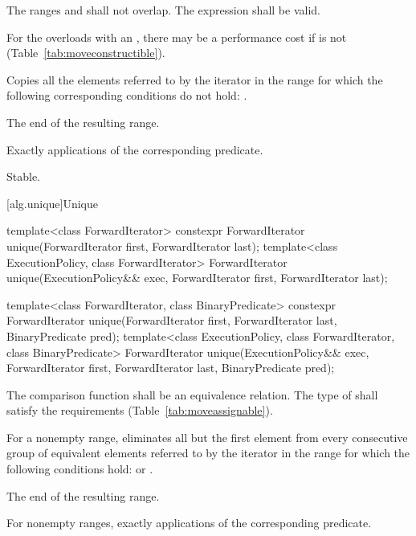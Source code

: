 \begin{itemdescr}
\pnum
\requires
The ranges
and
shall not overlap. The expression  shall be valid.
\begin{note}
For the overloads with an , there may be a performance
cost if  is not
 (Table~\ref{tab:moveconstructible}).
\end{note}

\pnum
\effects
Copies all the elements referred to by the iterator
in the range
for which the following corresponding conditions do not hold:
.

\pnum
\returns
The end of the resulting range.

\pnum
\complexity
Exactly
applications of the corresponding predicate.

\pnum
\remarks Stable.
\end{itemdescr}

[alg.unique]{Unique}

%
\begin{itemdecl}
template<class ForwardIterator>
  constexpr ForwardIterator unique(ForwardIterator first, ForwardIterator last);
template<class ExecutionPolicy, class ForwardIterator>
  ForwardIterator unique(ExecutionPolicy&& exec,
                         ForwardIterator first, ForwardIterator last);

template<class ForwardIterator, class BinaryPredicate>
  constexpr ForwardIterator unique(ForwardIterator first, ForwardIterator last,
                                   BinaryPredicate pred);
template<class ExecutionPolicy, class ForwardIterator, class BinaryPredicate>
  ForwardIterator unique(ExecutionPolicy&& exec,
                         ForwardIterator first, ForwardIterator last,
                         BinaryPredicate pred);
\end{itemdecl}

\begin{itemdescr}
\pnum
\requires
The comparison function shall be an equivalence relation.
The type of  shall satisfy the
 requirements (Table~\ref{tab:moveassignable}).

\pnum
\effects
For a nonempty range, eliminates all but the first element from every
consecutive group of equivalent elements referred to by the iterator
in the range
for which the following conditions hold:
or
.

\pnum
\returns
The end of the resulting range.

\pnum
\complexity
For nonempty ranges, exactly
applications of the corresponding predicate.
\end{itemdescr}

